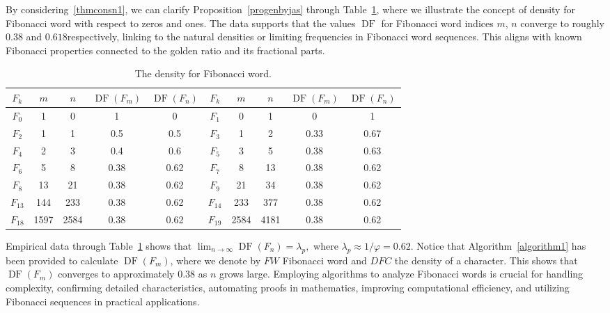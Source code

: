 \documentclass[11pt, a4paper]{article}
\newcommand{\DF}{\operatorname{DF}}
\theoremstyle{definition}
\begin{document}
By considering~\eqref{thmconsn1}, we can clarify Proposition~\ref{progenbyjas} through Table~\ref{tab1densityfibwo}, where we illustrate the concept of density for Fibonacci word with respect to zeros and ones. The data supports that the values $\DF$ for Fibonacci word indices $m$, $n$ converge to roughly $0.38$ and $0.618$respectively, linking to the natural densities or limiting frequencies in Fibonacci word sequences. This aligns with known Fibonacci properties connected to the golden ratio and its fractional parts.

\begin{table}[H]
    \centering
\begin{tabular}{|c|c|c|c|c||c|c|c|c|c|}
\hline
$F_k$ & $m$ & $n$ & $\DF(F_m)$ & $\DF(F_n)$ & $F_k$ & $m$ & $n$ & $\DF(F_m)$ & $\DF(F_n)$ \\
\hline
$F_0$ & 1 & 0 & 1 & 0 & $F_1$ & 0 & 1 & 0 & 1 \\ \hline 
$F_2$ & 1 & 1 & 0.5 & 0.5 & $F_3$ & 1 & 2 & 0.33 & 0.67 \\ \hline
$F_4$ & 2 & 3 & 0.4 & 0.6 & $F_5$ & 3 & 5 & 0.38 & 0.63 \\ \hline
$F_6$ & 5 & 8 & 0.38 & 0.62 & $F_7$ & 8 & 13 & 0.38 & 0.62 \\ \hline
$F_8$ & 13 & 21 & 0.38 & 0.62 & $F_9$ & 21 & 34 & 0.38 & 0.62 \\ \hline
$F_{13}$ & 144 & 233 & 0.38 & 0.62 & $F_{14}$ & 233 & 377 & 0.38 & 0.62 \\ \hline
$F_{18}$ & 1597 & 2584 & 0.38 & 0.62 & $F_{19}$ & 2584 & 4181 & 0.38 & 0.62 \\ \hline 
\end{tabular}
\caption{The density for Fibonacci word.}
\label{tab1densityfibwo}
\end{table}

Empirical data through Table~\ref{tab1densityfibwo} shows that $\lim_{n \to \infty} \DF(F_n) = \lambda_p,$ where $\lambda_p \approx 1/\varphi = 0.62$. Notice that Algorithm~\ref{algorithm1} has been provided to calculate $\DF(F_m)$, where we denote by $FW$ Fibonacci word and $DFC$ the density of a character. This shows that $\DF(F_m)$ converges to approximately $0.38$ as $n$ grows large. Employing algorithms to analyze Fibonacci words is crucial for handling complexity, confirming detailed characteristics, automating proofs in mathematics, improving computational efficiency, and utilizing Fibonacci sequences in practical applications.
\end{document}
